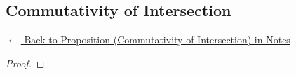 
\subsection*{Commutativity of Intersection}
\label{prf:comm-intersection}

\begin{remark*}[Return]
\hyperref[prop:comm-intersection]{$\leftarrow$ Back to Proposition (Commutativity of Intersection) in Notes}
\end{remark*}

\begin{proof}
\end{proof}

\begin{remark*}

\end{remark*}

\begin{remark*}[Dependencies]

\FlashUses{}
\end{remark*}
